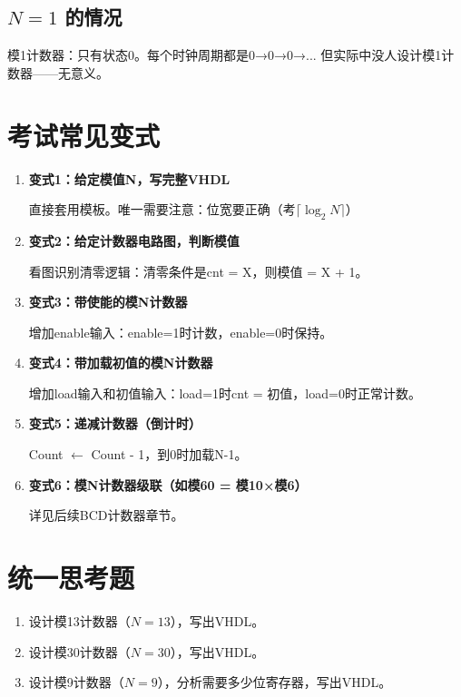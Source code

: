\subsection{$N = 1$ 的情况}

模1计数器：只有状态0。每个时钟周期都是0→0→0→...
但实际中没人设计模1计数器——无意义。

\section{考试常见变式}

\begin{enumerate}
  \item \textbf{变式1：给定模值N，写完整VHDL}

  直接套用模板。唯一需要注意：位宽要正确（考$\lceil \log_2 N \rceil$）

  \item \textbf{变式2：给定计数器电路图，判断模值}

  看图识别清零逻辑：清零条件是cnt = X，则模值 = X + 1。

  \item \textbf{变式3：带使能的模N计数器}

  增加enable输入：enable=1时计数，enable=0时保持。

  \item \textbf{变式4：带加载初值的模N计数器}

  增加load输入和初值输入：load=1时cnt = 初值，load=0时正常计数。

  \item \textbf{变式5：递减计数器（倒计时）}

  Count $\leftarrow$ Count - 1，到0时加载N-1。

  \item \textbf{变式6：模N计数器级联（如模60 = 模10×模6）}

  详见后续BCD计数器章节。
\end{enumerate}

\section{统一思考题}

\begin{enumerate}
  \item 设计模13计数器（$N=13$），写出VHDL。
  \item 设计模30计数器（$N=30$），写出VHDL。
  \item 设计模9计数器（$N=9$），分析需要多少位寄存器，写出VHDL。
\end{enumerate}

